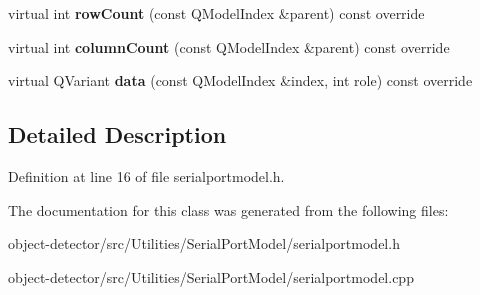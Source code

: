 \begin{DoxyCompactItemize}
$$virtual int {\bfseries row\+Count} (const Q\+Model\+Index \&parent) const override
\item 
\mbox{\label{class_utilities_1_1_serial_port_model_ad0460ff6a97ffe21fca772327f6440f3}} 
virtual int {\bfseries column\+Count} (const Q\+Model\+Index \&parent) const override
\item 
\mbox{\label{class_utilities_1_1_serial_port_model_abf2e5036c85fea58eea037c7fcd1294f}} 
virtual Q\+Variant {\bfseries data} (const Q\+Model\+Index \&index, int role) const override
\end{DoxyCompactItemize}


\subsection{Detailed Description}


Definition at line 16 of file serialportmodel.\+h.



The documentation for this class was generated from the following files\+:\begin{DoxyCompactItemize}
\item 
object-\/detector/src/\+Utilities/\+Serial\+Port\+Model/serialportmodel.\+h\item 
object-\/detector/src/\+Utilities/\+Serial\+Port\+Model/serialportmodel.\+cpp\end{DoxyCompactItemize}
